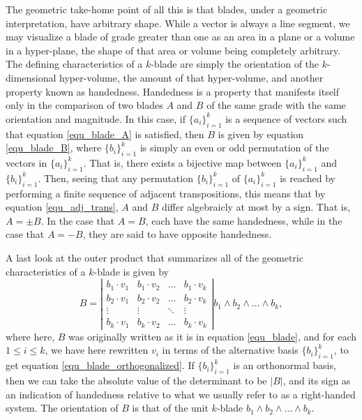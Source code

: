 \documentclass[12pt]{article}
\begin{document}
The geometric take-home point of all this is that blades, under a geometric interpretation,
have arbitrary shape.  While a vector is always a line segment, we may visualize a blade of
grade greater than one
as an area in a plane or a volume in a hyper-plane, the shape of that area or volume being completely
arbitrary.  The defining characteristics of a $k$-blade are simply the orientation of the $k$-dimensional
hyper-volume, the amount of that hyper-volume, and another property known as handedness.
Handedness is a property
that manifests itself only in the comparison of two blades $A$ and $B$ of the same grade with
the same orientation
and magnitude.  In this case, if $\{a_i\}_{i=1}^k$ is a sequence of vectors such
that equation \eqref{equ_blade_A} is satisfied, then $B$ is given by equation
\eqref{equ_blade_B}, where $\{b_i\}_{i=1}^k$ is simply an even or odd permutation
of the vectors in $\{a_i\}_{i=1}^k$.  That is, there exists a bijective map between
$\{a_i\}_{i=1}^k$ and $\{b_i\}_{i=1}^k$.
Then, seeing that any permutation $\{b_i\}_{i=1}^k$ of $\{a_i\}_{i=1}^k$
is reached by performing a finite sequence of adjacent transpositions, this means that
by equation \eqref{equ_adj_trans}, $A$ and $B$ differ algebraicly at most by a sign.
That is, $A=\pm B$.  In the case that $A=B$, each have the same handedness,
while in the case that $A=-B$, they are said to have opposite handedness.

A last look at the outer product that summarizes all of the geometric characteristics of a $k$-blade
is given by
\begin{equation}\label{equ_blade_orthogonalized}
B = \left|\begin{array}{cccc}
b_1\cdot v_1 & b_1\cdot v_2 & \dots & b_1\cdot v_k \\
b_2\cdot v_1 & b_2\cdot v_2 & \dots & b_2\cdot v_k \\
\vdots & \vdots & \ddots & \vdots \\
b_k\cdot v_1 & b_k\cdot v_2 & \dots & b_k\cdot v_k
\end{array}\right|b_1\wedge b_2\wedge\dots\wedge b_k,
\end{equation}
where here, $B$ was originally written as it is in equation \eqref{equ_blade}, and
for each $1\leq i\leq k$, we have here rewritten $v_i$ in terms of the alternative basis $\{b_i\}_{i=1}^k$,
to get equation \eqref{equ_blade_orthogonalized}.  If $\{b_i\}_{i=1}^k$ is an orthonormal basis,
then we can take the absolute value of the determinant to be $|B|$, and its sign as an
indication of handedness relative to what we usually refer to as a right-handed system.
The orientation of $B$ is that of the unit $k$-blade $b_1\wedge b_2\wedge\dots\wedge b_k$.
\end{document}
